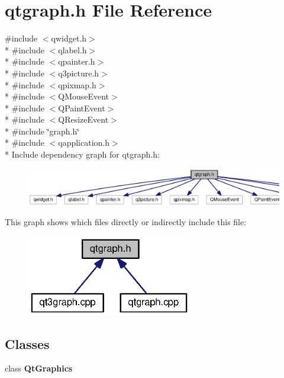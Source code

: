 \section{qtgraph.\-h File Reference}
\label{qtgraph_8h}
{\ttfamily \#include $<$qwidget.\-h$>$}\\*
{\ttfamily \#include $<$qlabel.\-h$>$}\\*
{\ttfamily \#include $<$qpainter.\-h$>$}\\*
{\ttfamily \#include $<$q3picture.\-h$>$}\\*
{\ttfamily \#include $<$qpixmap.\-h$>$}\\*
{\ttfamily \#include $<$Q\-Mouse\-Event$>$}\\*
{\ttfamily \#include $<$Q\-Paint\-Event$>$}\\*
{\ttfamily \#include $<$Q\-Resize\-Event$>$}\\*
{\ttfamily \#include \char`\"{}graph.\-h\char`\"{}}\\*
{\ttfamily \#include $<$qapplication.\-h$>$}\\*
Include dependency graph for qtgraph.\-h\-:
\nopagebreak
\begin{figure}[H]
\begin{center}
\leavevmode
\includegraphics[width=350pt]{qtgraph_8h__incl}
\end{center}
\end{figure}
This graph shows which files directly or indirectly include this file\-:
\nopagebreak
\begin{figure}[H]
\begin{center}
\leavevmode
\includegraphics[width=205pt]{qtgraph_8h__dep__incl}
\end{center}
\end{figure}
\subsection*{Classes}
\begin{DoxyCompactItemize}
\item 
class {\bf Qt\-Graphics}
\end{DoxyCompactItemize}
